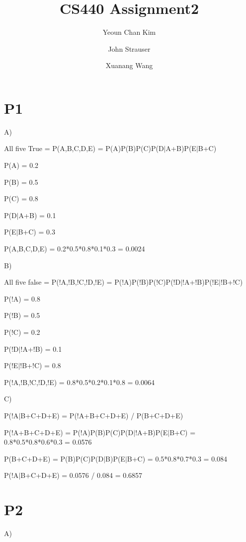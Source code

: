 \documentclass{article}
\author{Yeoun Chan Kim \and John Strauser \and Xuanang Wang}
\title{CS440 Assignment2}
\begin{document}
\maketitle

\section*{P1}

\hspace{5mm}


A) 	

        All five True = P(A,B,C,D,E) = P(A)P(B)P(C)P(D$|$A+B)P(E$|$B+C)

	P(A) = 0.2
	
	P(B) = 0.5
	
	P(C) = 0.8
	
	P(D$|$A+B) = 0.1
	
	P(E$|$B+C) = 0.3
	
	P(A,B,C,D,E) = 0.2*0.5*0.8*0.1*0.3 = 0.0024

\hspace{5mm}

B)	

        All five false = P(!A,!B,!C,!D,!E) = P(!A)P(!B)P(!C)P(!D$|$!A+!B)P(!E$|$!B+!C)
        
	P(!A) = 0.8
	
	P(!B) = 0.5
	
	P(!C) = 0.2
	
	P(!D$|$!A+!B) = 0.1
	
	P(!E$|$!B+!C) = 0.8
	
	P(!A,!B,!C,!D,!E) = 0.8*0.5*0.2*0.1*0.8 = 0.0064

\hspace{5mm}

C)	

        P(!A$|$B+C+D+E) = P(!A+B+C+D+E) / P(B+C+D+E)

	P(!A+B+C+D+E) = P(!A)P(B)P(C)P(D$|$!A+B)P(E$|$B+C) = 0.8*0.5*0.8*0.6*0.3 = 0.0576
	
	P(B+C+D+E) = P(B)P(C)P(D$|$B)P(E$|$B+C) = 0.5*0.8*0.7*0.3 = 0.084
	
	P(!A$|$B+C+D+E) = 0.0576 / 0.084 = 0.6857
	
	
\section*{P2}

\hspace{5mm}

A) 	
\end{document}
